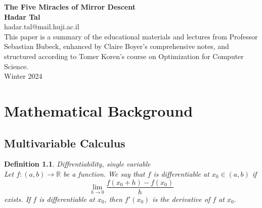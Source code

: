 \documentclass[11pt]{book} %
\newtheorem{definition}{Definition}[section]
\begin{document}
\begin{titlepage}
    \begin{center}
     {\huge\bfseries The Five Miracles of Mirror Descent \\}
     \vspace{1.5cm}
     {\Large\bfseries Hadar Tal}\\[5pt]
     hadar.tal@mail.huji.ac.il\\[14pt]
     \vspace{2cm}
     {This paper is a summary of the educational materials and lectures from Professor Sebastian Bubeck, enhanced by Claire Boyer's comprehensive notes, and structured according to Tomer Koren's course on Optimization for Computer Science.} \\[2cm]

     \vfill
    {Winter 2024}
    \end{center}
\end{titlepage}


\frontmatter
\tableofcontents


\mainmatter
\chapter{Mathematical Background}




\section{Multivariable Calculus}
\begin{definition}{Diffrentiability, single variable} \\
Let $f: (a,b) \rightarrow \mathbb{R}$ be a function. We say that $f$ is differentiable at $x_0 \in (a,b)$ if
\begin{equation}
    \lim_{h \rightarrow 0} \frac{f(x_0 + h) - f(x_0)}{h}
\end{equation}
exists. If $f$ is differentiable at $x_0$, then $f'(x_0)$ is the derivative of $f$ at $x_0$.
\end{definition} 
\end{document}
